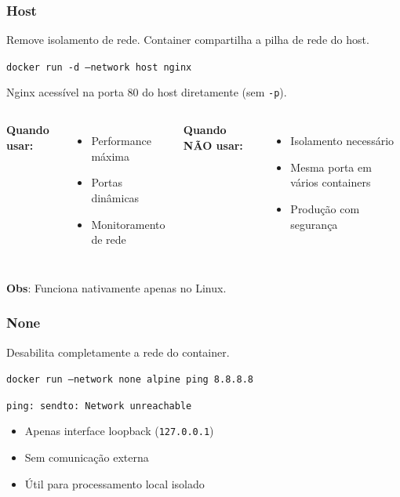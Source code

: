 \begin{frame}
  \frametitle{Host}
  Remove isolamento de rede. Container compartilha a pilha de rede do host.

  \vspace{0.5em}
  \texttt{docker run -d --network host nginx}

  \vspace{0.3em}
  Nginx acessível na porta 80 do host diretamente (sem \texttt{-p}).

  \vspace{0.8em}
  \begin{columns}
      \textbf{Quando usar:}
      \begin{itemize}
        \item Performance máxima
        \item Portas dinâmicas
        \item Monitoramento de rede
      \end{itemize}

      \textbf{Quando NÃO usar:}
      \begin{itemize}
        \item Isolamento necessário
        \item Mesma porta em vários containers
        \item Produção com segurança
      \end{itemize}
  \end{columns}

  \vspace{0.5em}
  \small \textbf{Obs}: Funciona nativamente apenas no Linux.
\end{frame}

\begin{frame}
  \frametitle{None}
  Desabilita completamente a rede do container.

  \vspace{0.5em}
  \texttt{docker run --network none alpine ping 8.8.8.8}

  \texttt{ping: sendto: Network unreachable}

  \vspace{0.8em}
  \begin{itemize}
    \item Apenas interface loopback (\texttt{127.0.0.1})
    \item Sem comunicação externa
    \item Útil para processamento local isolado
  \end{itemize}
\end{frame}

